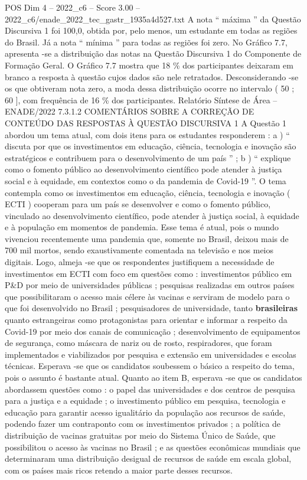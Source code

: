 \begin{textsample}{POS Dim 4 – 2022\_c6 – Score 3.00 – 2022\_c6/enade\_2022\_tec\_gastr\_1935a4d527.txt}
A nota “ máxima ” da Questão Discursiva 1 foi 100,0, obtida por, pelo menos, um estudante em todas as regiões do Brasil.
Já a nota “ mínima ” para todas as regiões foi zero.
No Gráfico 7.7, apresenta -se a distribuição das notas na Questão Discursiva 1 do Componente de Formação Geral.
O Gráfico 7.7 mostra que 18 \% dos participantes deixaram em branco a resposta à questão cujos dados são nele retratados.
Desconsiderando -se os que obtiveram nota zero, a moda dessa distribuição ocorre no intervalo ( 50 ; 60 ], com frequência de 16 \% dos participantes.
Relatório Síntese de Área – ENADE/2022 7.3.1.2 COMENTÁRIOS SOBRE A CORREÇÃO DE CONTEÚDO DAS RESPOSTAS À QUESTÃO DISCURSIVA 1 A Questão 1 abordou um tema atual, com dois itens para os estudantes responderem : a ) “ discuta por que os investimentos em educação, ciência, tecnologia e inovação são estratégicos e contribuem para o desenvolvimento de um país ” ; b ) “ explique como o fomento público ao desenvolvimento científico pode atender à justiça social e à equidade, em contextos como o da pandemia de Covid-19 ”.
O tema contempla como os investimentos em educação, ciência, tecnologia e inovação ( ECTI ) cooperam para um país se desenvolver e como o fomento público, vinculado ao desenvolvimento científico, pode atender à justiça social, à equidade e à população em momentos de pandemia.
Esse tema é atual, pois o mundo vivenciou recentemente uma pandemia que, somente no Brasil, deixou mais de 700 mil mortos, sendo exaustivamente comentada na televisão e nos meios digitais.
Logo, almeja -se que os respondentes justifiquem a necessidade de investimentos em ECTI com foco em questões como : investimentos público em P\&D por meio de universidades públicas ; pesquisas realizadas em outros países que possibilitaram o acesso mais célere às vacinas e serviram de modelo para o que foi desenvolvido no Brasil ; pesquisadores de universidade, tanto \textbf{brasileiras} quanto estrangeiras como protagonistas para orientar e informar a respeito da Covid-19 por meio dos canais de comunicação ; desenvolvimento de equipamentos de segurança, como máscara de nariz ou de rosto, respiradores, que foram implementados e viabilizados por pesquisa e extensão em universidades e escolas técnicas.
Esperava -se que os candidatos soubessem o básico a respeito do tema, pois o assunto é bastante atual.
Quanto ao item B, esperava -se que os candidatos abordassem questões como : o papel das universidades e dos centros de pesquisa para a justiça e a equidade ; o investimento público em pesquisa, tecnologia e educação para garantir acesso igualitário da população aos recursos de saúde, podendo fazer um contraponto com os investimentos privados ; a política de distribuição de vacinas gratuitas por meio do Sistema Único de Saúde, que possibilitou o acesso às vacinas no Brasil ; e as questões econômicas mundiais que determinaram uma distribuição desigual de recursos de saúde em escala global, com os países mais ricos retendo a maior parte desses recursos.

\end{textsample}
